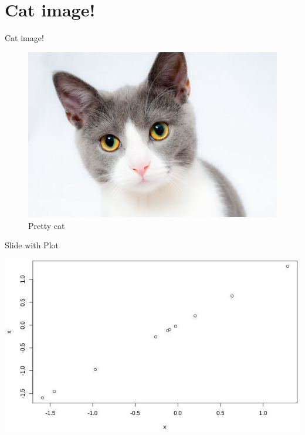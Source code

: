 \documentclass[ignorenonframetext,]{beamer}
\begin{document}
\hypertarget{cat-image}{%
\section{Cat image!}\label{cat-image}}

\begin{frame}{Cat image!}
\protect\hypertarget{cat-image-1}{}

\begin{figure}
\centering
\includegraphics{cat.jpeg}
\caption{Pretty cat}
\end{figure}

\end{frame}

\begin{frame}{Slide with Plot}
\protect\hypertarget{slide-with-plot}{}

\scriptsize\includegraphics{example_files/figure-beamer/unnamed-chunk-3-1.jpeg}

\end{frame}

\end{document}
